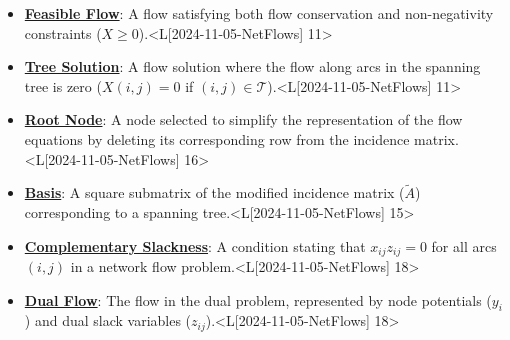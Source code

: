 \documentclass{article}%
\begin{document}
\begin{itemize}[[leftmargin=*]]
\item \href{https://www.math.purdue.edu/~yipn/421/2024-11-05-NetFlows.pdf#page=11}{\textbf{Feasible Flow}}: A flow satisfying both flow conservation and non-negativity constraints ($X \ge 0$).<L[2024-11-05-NetFlows] 11>%
\item \href{https://www.math.purdue.edu/~yipn/421/2024-11-05-NetFlows.pdf#page=11}{\textbf{Tree Solution}}: A flow solution where the flow along arcs in the spanning tree is zero ($X(i,j) = 0$ if $(i,j) \in \mathcal{T}$).<L[2024-11-05-NetFlows] 11>%
\item \href{https://www.math.purdue.edu/~yipn/421/2024-11-05-NetFlows.pdf#page=16}{\textbf{Root Node}}: A node selected to simplify the representation of the flow equations by deleting its corresponding row from the incidence matrix.<L[2024-11-05-NetFlows] 16>%
\item \href{https://www.math.purdue.edu/~yipn/421/2024-11-05-NetFlows.pdf#page=15}{\textbf{Basis}}: A square submatrix of the modified incidence matrix ($\tilde{A}$) corresponding to a spanning tree.<L[2024-11-05-NetFlows] 15>%
\item \href{https://www.math.purdue.edu/~yipn/421/2024-11-05-NetFlows.pdf#page=18}{\textbf{Complementary Slackness}}: A condition stating that $x_{ij}z_{ij} = 0$ for all arcs $(i,j)$ in a network flow problem.<L[2024-11-05-NetFlows] 18>%
\item \href{https://www.math.purdue.edu/~yipn/421/2024-11-05-NetFlows.pdf#page=18}{\textbf{Dual Flow}}: The flow in the dual problem, represented by node potentials ($y_i$) and dual slack variables ($z_{ij}$).<L[2024-11-05-NetFlows] 18>%
\end{itemize}%
\end{document}
